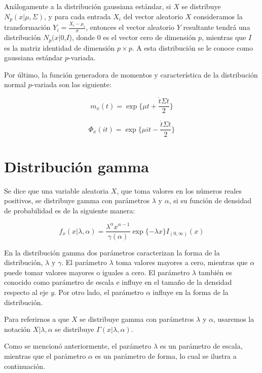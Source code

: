 \newpage
Análogamente a la distribución gaussiana estándar, si $X$ se distribuye $N_{p}(x|\mu,\Sigma)$, y para cada entrada $X_{i}$ del vector aleatorio $X$ consideramos la transformación $Y_{i}=\frac{X_{i}-\mu_{i}}{\sigma}$, entonces el vector aleatorio $Y$ resultante tendrá una distribución $N_{p}(x|$\boldmath$0$,\boldmath $I$), donde \boldmath$0$ es el vector cero de dimensión $p$, mientras que \boldmath $I$ es la matriz identidad de dimensión $p\times p$. A esta distribución se le conoce como gaussiana estándar $p$-variada.

Por último, la función generadora de momentos y característica de la distribución normal $p$-variada son las siguiente: 

\begin{equation}
	m_{x}(t)=\exp\{\mu t +\frac{\acute{t}\Sigma t}{2}\}
\end{equation}

\begin{equation}
	\Phi_{x}(it)=\exp\{\mu it -\frac{\acute{t}\Sigma t}{2}\}
\end{equation}

\section{Distribución gamma}
Se dice que una variable aleatoria $X$, que toma valores en los números reales positivos, se distribuye gamma con parámetros $\lambda$ y $\alpha$, si su función de densidad de probabilidad es de la siguiente manera:

\begin{equation}
	f_{x}(x|\lambda, \alpha)=\frac{\lambda^{\alpha}x^{\alpha-1}}{\gamma(\alpha)}\exp\{-\lambda x\}I_{(0,\infty)}(x)
\end{equation}

En la distribución gamma dos parámetros caracterizan la forma de la distribución,  $\lambda$ y $\gamma$. El parámetro $\lambda$ toma valores mayores a cero, mientras que $\alpha$ puede tomar valores mayores o iguales a cero. El parámetro $\lambda$ también es conocido como parámetro de escala e influye en el tamaño de la densidad respecto al eje $y$. Por otro lado, el parámetro $\alpha$ influye en la forma de la distribución. 

Para referirnos a que $X$ se distribuye gamma con parámetros $\lambda$ y $\alpha$, usaremos la notación $X|\lambda,\alpha$ se distribuye $\Gamma(x|\lambda,\alpha)$.

Como se mencionó anteriormente, el parámetro $\lambda$ es un parámetro de escala, mientras que el parámetro $\alpha$ es un parámetro de forma, lo cual se ilustra a continuación.

